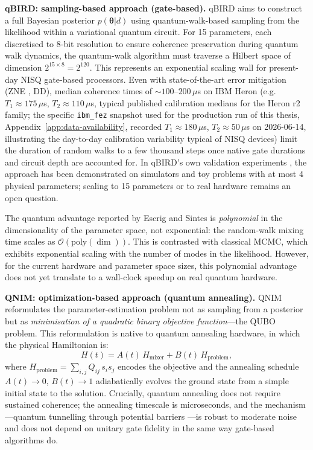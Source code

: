\documentclass[11pt,a4paper, english]{book}
\theoremstyle{plain}
\theoremstyle{definition}
\numberwithin{equation}{chapter}
\numberwithin{figure}{chapter}
\numberwithin{table}{chapter}
\begin{document}
\textbf{qBIRD: sampling-based approach (gate-based).} qBIRD aims to construct
a full Bayesian posterior $p(\boldsymbol{\theta}|d)$ using quantum-walk-based
sampling from the likelihood within a variational quantum circuit. For
15 parameters, each discretised to 8-bit resolution to ensure coherence
preservation during quantum walk dynamics, the quantum-walk algorithm must
traverse a Hilbert space of dimension $2^{15 \times 8} = 2^{120}$. This represents
an exponential scaling wall for present-day NISQ gate-based processors.
Even with state-of-the-art error mitigation (ZNE \cite{Temme_2017}, DD), median
coherence times of ${\sim}100$--$200\,\mu$s on IBM Heron
(e.g.\ $T_1\approx175\,\mu$s, $T_2\approx110\,\mu$s, typical published
calibration medians for the Heron r2 family; the specific
\texttt{ibm\_fez} snapshot used for the production run of this thesis,
Appendix~\ref{app:data-availability}, recorded
$T_1\approx180\,\mu$s, $T_2\approx50\,\mu$s on 2026-06-14, illustrating
the day-to-day calibration variability typical of NISQ devices)
limit the duration of random walks to a few
thousand steps once native gate durations and circuit depth are accounted for. In qBIRD's own validation experiments \cite{Escrig_2024_qBIRD},
the approach has been demonstrated on simulators and toy problems with
at most 4 physical parameters; scaling to 15 parameters or to real hardware
remains an open question.

The quantum advantage reported by Escrig and Sintes is \emph{polynomial}
in the dimensionality of the parameter space, not exponential: the
random-walk mixing time scales as $\mathcal{O}(\text{poly}(\dim))$.
This is contrasted with classical MCMC, which exhibits exponential scaling
with the number of modes in the likelihood. However, for the current hardware
and parameter space sizes, this polynomial advantage does not yet translate
to a wall-clock speedup on real quantum hardware.

\textbf{QNIM: optimization-based approach (quantum annealing).} QNIM reformulates
the parameter-estimation problem not as sampling from a posterior but as
\emph{minimisation of a quadratic binary objective function}---the QUBO problem.
This reformulation is native to quantum annealing hardware, in which the
physical Hamiltonian is:
\begin{equation}
  \label{eq:app-annealing-hamiltonian}
  H(t) = A(t)\,H_\mathrm{mixer} + B(t)\,H_\mathrm{problem},
\end{equation}
where $H_\mathrm{problem} = \sum_{i,j} Q_{ij}\,s_i s_j$ encodes the objective
and the annealing schedule $A(t) \to 0$, $B(t) \to 1$ adiabatically evolves
the ground state from a simple initial state to the solution. Crucially,
quantum annealing does not require sustained coherence; the annealing timescale
is microseconds, and the mechanism---quantum tunnelling through potential
barriers \cite{Boixo_2016}---is robust to moderate noise and does not depend on unitary gate
fidelity in the same way gate-based algorithms do.
\end{document}
